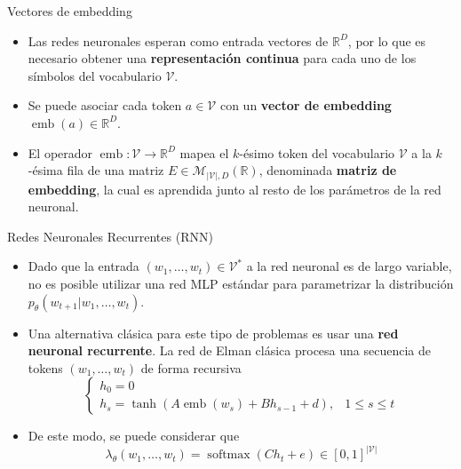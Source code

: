 \documentclass{beamer}
\newcommand{\R}{\mathbb{R}}
\begin{document}
\begin{frame}{Vectores de embedding}
    \begin{itemize}
        \item Las redes neuronales esperan como entrada vectores de $\R^D$, por lo que es necesario obtener una \textbf{representación continua} para cada uno de los símbolos del vocabulario $\mathcal{V}$.
        \item Se puede asociar cada token $a\in\mathcal{V}$ con un \textbf{vector de embedding} $\operatorname{emb}(a)\in\R^D$.
        \item El operador $\operatorname{emb}:\mathcal{V}\to\R^D$ mapea el $k$-ésimo token del vocabulario $\mathcal{V}$ a la $k$-ésima fila de una matriz $E\in\mathcal{M}_{|\mathcal{V}|,D}(\R)$, denominada \textbf{matriz de embedding}, la cual es aprendida junto al resto de los parámetros de la red neuronal.
    \end{itemize}
\end{frame}

\begin{frame}{Redes Neuronales Recurrentes (RNN)}
    \begin{itemize}
        \item Dado que la entrada $(w_1,\ldots,w_t)\in\mathcal{V}^*$ a la red neuronal es de largo variable, no es posible utilizar una red MLP estándar para parametrizar la distribución $p_\theta(w_{t+1}|w_1,\ldots,w_t)$.
        \item Una alternativa clásica para este tipo de problemas es usar una \textbf{red neuronal recurrente}. La red de Elman clásica procesa una secuencia de tokens $(w_1,\ldots,w_t)$ de forma recursiva
              \begin{equation*}
                  \begin{cases}
                      h_0 = 0                                            \\
                      h_s =\tanh(A\operatorname{emb}(w_s)+Bh_{s-1}+d), &
                      1\leq s\leq t
                  \end{cases}
              \end{equation*}
        \item  De este modo, se puede considerar que
              \begin{equation*}
                  \lambda_\theta(w_1,\ldots,w_t)=\operatorname{softmax}(Ch_t+e)\in[0,1]^{|\mathcal{V}|}
              \end{equation*}
    \end{itemize}
\end{frame}
\end{document}
